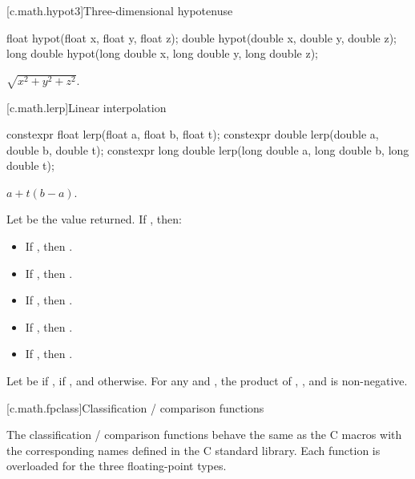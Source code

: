 
[c.math.hypot3]{Three-dimensional hypotenuse}

%
\begin{itemdecl}
float hypot(float x, float y, float z);
double hypot(double x, double y, double z);
long double hypot(long double x, long double y, long double z);
\end{itemdecl}

\begin{itemdescr}
\pnum
\returns $\sqrt{x^2+y^2+z^2}$.
\end{itemdescr}

[c.math.lerp]{Linear interpolation}

%
\begin{itemdecl}
constexpr float lerp(float a, float b, float t);
constexpr double lerp(double a, double b, double t);
constexpr long double lerp(long double a, long double b, long double t);
\end{itemdecl}
\begin{itemdescr}
\pnum
\returns
$a+t(b-a)$.

\pnum
\remarks
Let  be the value returned.
If , then:
\begin{itemize}
\item If , then .
\item If , then .
\item If , then .
\item If , then .
\item If , then .
\end{itemize}
Let  be  if ,
 if , and  otherwise.
For any  and , the product of
,
, and
is non-negative.
\end{itemdescr}

[c.math.fpclass]{Classification / comparison functions}

\pnum
The classification / comparison functions behave the same as the C macros with the
corresponding names defined in the C standard library.
Each function is overloaded for the three floating-point types.

